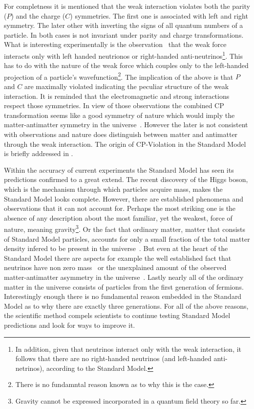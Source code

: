 For completness it is mentioned that the weak interaction violates both the parity ($P$) and the charge ($C$) symmetries.
The first one is associated with left and right symmetry. The later other with inverting the signs of all quantum numbers of a particle.
In both cases  is not invariant under parity and charge transformations. What is interesting experimentally
is the observation~\cite{wu-parity,garwin-parity} that the weak force interacts only with left handed neutrionos or right-handed
anti-neutrinos\footnote{In addition, given that neutrinos interact only with the weak interaction, it follows that there are no
right-handed neutrinos (and left-handed anti-netrinos), according to the Standard Model.}. This has to do with the nature of
the weak force which couples only to the left-handed projection of a particle's
wavefunction\footnote{There is no fundamntal reason known as to why this is the case.}. The implication of the above is that
$P$ and $C$ are maximally violated indicating the peculiar structure of the weak interaction. It is reminded that
the electromagnetic and strong interactions respect those symmetries. In view of those observations the combined CP transformation
seems like a good symmetry of nature which would imply the matter-antimatter symmetry in the universe~\cite{Sakharov:1967dj}.
However the later is not consistent with observations and nature does distinguish between matter and antimatter through
the weak interaction. The origin of CP-Violation in the Standard Model is briefly addressed in .

Within the accuracy of current experiments the Standard Model has seen its predictions confirmed to a great extend.
The recent discovery of the Higgs boson, which is the mechanism through which particles acquire mass, makes the Standard Model looks
complete. However, there are established phenomena and observations that it can not
account for. Perhaps the most striking one is the absence of any description about the most familiar, yet the weakest, force of nature,
meaning gravity\footnote{Gravity cannot be expressed incorporated in a quantum field theory so far.}.
Or the fact that ordinary matter, \ie matter that consists of Standard Model particles, accounts for only a small
fraction of the total matter density infered to be present in the universe~\cite{dmatter-Hinshaw}. But even at the heart
of the Standard Model there are aspects for example the well established fact that neutrinos have non zero
mass~\cite{nu-mass-superkam,nu-mass-kamland,nu-mass-sno,nu-mass-daya} or the unexplained amount of the observed
matter-antimatter asymmetry in the universe~\cite{more-cpv-huet,more-cpv-gavela_I,more-cpv-gavela_II}.
Lastly nearly all of the ordinary matter in the universe consists of
particles from the first generation of fermions. Interestingly enough there is no fundamental reason embedded in the Standard Model
as to why there are exactly three generations. For all of the above reasons, the scientific method compels scientists to continue
testing Standard Model predictions and look for ways to improve it.
